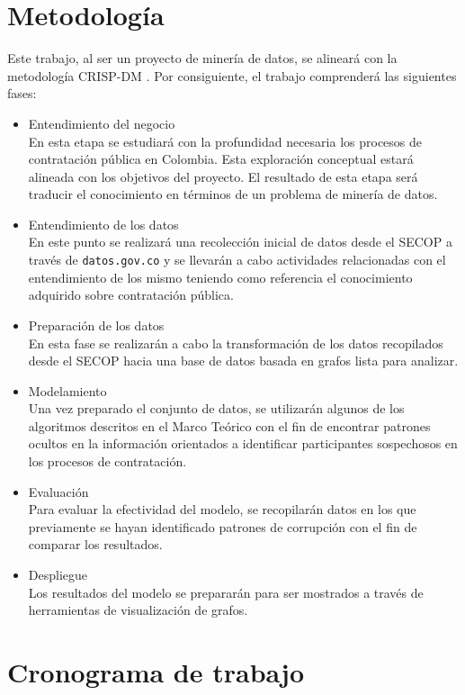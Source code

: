 \documentclass[11pt,letterpaper,oneside]{article}
\begin{document}
	\section{Metodología}
	Este trabajo, al ser un proyecto de minería de datos, se alineará con la metodología CRISP-DM \cite{crispdm-2000}. Por consiguiente, el trabajo comprenderá las siguientes fases:
	\begin{itemize}
	\item Entendimiento del negocio\\
	En esta etapa se estudiará con la profundidad necesaria los procesos de contratación pública en Colombia. Esta exploración conceptual estará alineada con los objetivos del proyecto. El resultado de esta etapa será traducir el conocimiento en términos de un problema de minería de datos.
	\item Entendimiento de los datos\\
	En este punto se realizará una recolección inicial de datos desde el SECOP a través de \texttt{datos.gov.co} y se llevarán a cabo actividades relacionadas con el entendimiento de los mismo teniendo como referencia el conocimiento adquirido sobre contratación pública.
	\item Preparación de los datos\\
	En esta fase se realizarán a cabo la transformación de los datos recopilados desde el SECOP hacia una base de datos basada en grafos lista para analizar.
	\item Modelamiento\\
	Una vez preparado el conjunto de datos, se utilizarán algunos de los algoritmos descritos en el Marco Teórico con el fin de encontrar patrones ocultos en la información orientados a identificar participantes sospechosos en los procesos de contratación.
	\item Evaluación\\
	Para evaluar la efectividad del modelo, se recopilarán datos en los que previamente se hayan identificado patrones de corrupción con el fin de comparar los resultados.
	\item Despliegue\\
	Los resultados del modelo se prepararán para ser mostrados a través de herramientas de visualización de grafos.
	\end{itemize}
	
	\section{Cronograma de trabajo}
	
\end{document}

